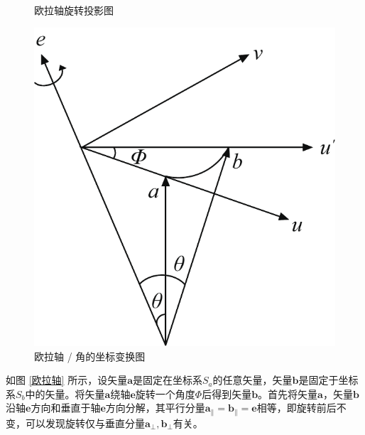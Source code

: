 \begin{figure}[!htb]
\begin{minipage}{0.33\linewidth}
        \vspace*{-2.6em}
		\caption{欧拉轴旋转投影图}
		\label{欧拉轴2}
	\end{minipage}
	\begin{minipage}{0.33\linewidth}
		\centering
		\includegraphics[width=0.913\linewidth]{pic/欧拉轴角}
		\caption{欧拉轴 / 角的坐标变换图}
		\label{欧拉轴角}
	\end{minipage}
\end{figure}

如图 \ref{欧拉轴} 所示，设矢量$\bm{a}$是固定在坐标系$S_a$的任意矢量，矢量$\bm{b}$是固定于坐标系$S_b$中的矢量。将矢量$\bm{a}$绕轴$\bm{e}$旋转一个角度$\varPhi$后得到矢量$\bm{b}$。首先将矢量$\bm{a}$，矢量$\bm{b}$沿轴$\bm{e}$方向和垂直于轴$\bm{e}$方向分解，其平行分量$\bm{a}_{\parallel} = \bm{b}_{\parallel} = \bm{e}$相等，即旋转前后不变，可以发现旋转仅与垂直分量$\bm{a}_{\perp}, \bm{b}_{\perp}$有关。

